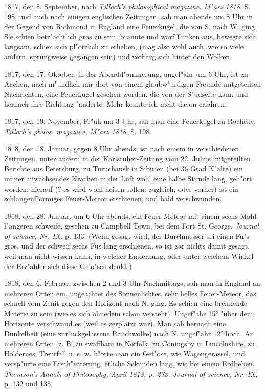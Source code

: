 \documentclass[a4paper, 11pt, oneside, polutonikogreek, german]{article}
\begin{document}
1817, den 8. September, nach \emph{Tilloch's philosophical magazine, M"arz 1818}, S. 198, und auch nach einigen englischen Zeitungen, sah man abends um 8 Uhr in der Gegend von Richmond in England eine Feuerkugel, die von S. nach W. ging. Sie schien betr"achtlich gros zu sein, brannte und warf Funken aus, bewegte sich langsam, schien sich pl"otzlich zu erheben, (mag also wohl auch, wie so viele andern, sprungweise gegangen sein) und verbarg sich hinter den Wolken.

1817, den 17. Oktober, in der Abendd"ammerung, ungef"ahr um 6 Uhr, ist zu Aachen, nach m"undlich mir dort von einem glaubw"urdigen Freunde mitgeteilten Nachrichten, eine Feuerkugel gesehen worden, die von der S"udseite kam, und hernach ihre Richtung "anderte. Mehr konnte ich nicht davon erfahren.

1817, den 19. November, Fr"uh um 3 Uhr, sah man eine Feuerkugel zu Rochelle. \emph{Tilloch's philos. magazine, M"arz 1818}, S. 198.

1818, den 18. Januar, gegen 8 Uhr abends, ist nach einem in verschiedenen Zeitungen, unter andern in der Karlsruher-Zeitung vom 22. Julius mitgeteilten Berichte aus Petersburg, zu Turuchansk in Sibirien (bei 36 Grad K"alte) ein immer anwachsendes Krachen in der Luft wohl eine halbe Stunde lang, geh"ort worden, hierauf (? es wird wohl heisen sollen: zugleich, oder vorher) ist ein schlangenf"ormiges Feuer-Meteor erschienen, und bald verschwunden.

1818, den 28. Januar, um 6 Uhr abends, ein Feuer-Meteor mit einem sechs Mahl l"angeren schweife, gesehen zu Campbell Town, bei dem Fort St. George. \emph{Journal of science, Nr. IX.} p. 133. (Wenn gesagt wird, der Durchmesser sei einen Fu"s gros, und der schweif sechs Fus lang erschienen, so ist gar nichts damit gesagt, weil man nicht wissen kann, in welcher Entfernung, oder unter welchem Winkel der Erz"ahler sich diese Gr"o"sen denkt.)

1818, den 6. Februar, zwischen 2 und 3 Uhr Nachmittags, sah man in England an mehreren Orten ein, ungeachtet des Sonnenlichtes, sehr helles Feuer-Meteor, das schnell vom Zenit gegen den Horizont nach N. ging. Es schien eine brennende Materie zu sein (wie es sich ohnedem schon versteht). Ungef"ahr 15° "uber dem Horizonte verschwand es (weil es zerplatzt war). Man sah hernach eine Dunkelheit (eine zur"uckgelassene Rauchwolke) nach N. ungef"ahr 12° hoch. An mehreren Orten, z. B. zu swaffham in Norfolk, zu Coningsby in Lincolnshire, zu Holdernes, Trentfall u. s. w. h"orte man ein Get"ose, wie Wagengerassel, und versp"urte eine Ersch"utterung, etliche Sekunden lang, wie bei einem Erdbeben. \emph{Thomson's Annals of Philosophy, April 1818, p. 273. Journal of science, Nr. IX,} p. 132 und 135.
\end{document}
